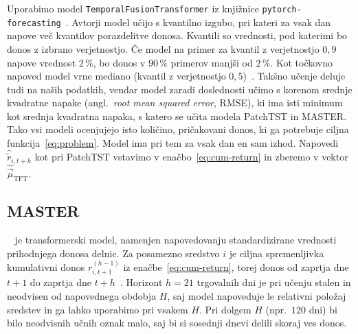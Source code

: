 \documentclass[9pt]{style/friteza}
\begin{document}
Uporabimo model \texttt{TemporalFusionTransformer} iz knjižnice \texttt{pytorch-\allowbreak forecasting}~\cite{beitner2020pytorch}. Avtorji model učijo s kvantilno izgubo, pri kateri za vsak dan napove več kvantilov porazdelitve donosa. Kvantili so vrednosti, pod katerimi bo donos z izbrano verjetnostjo. Če model na primer za kvantil z verjetnostjo $0{,}9$ napove vrednost $2\,\%$, bo donos v $90\,\%$ primerov manjši od $2\,\%$. Kot točkovno napoved model vrne mediano (kvantil z verjetnostjo $0{,}5$)~\cite{lim2021tft}. Takšno učenje deluje tudi na naših podatkih, vendar model zaradi doslednosti učimo s korenom srednje kvadratne napake (angl.\ \emph{root mean squared error}, RMSE), ki ima isti minimum kot srednja kvadratna napaka, s katero se učita modela PatchTST in MASTER. Tako vsi modeli ocenjujejo isto količino, pričakovani donos, ki ga potrebuje ciljna funkcija~\eqref{eq:problem}. Model ima pri tem za vsak dan en sam izhod. Napovedi $\hat{\tilde r}_{i,t+h}$ kot pri PatchTST vstavimo v enačbo~\eqref{eq:cum-return} in zberemo v vektor $\hat{\vec{\mu}}_{\mathrm{TFT}}$. 


\subsection{MASTER}\label{sec:master}~\cite{li2024master} je transformerski model, namenjen napovedovanju standardizirane vrednosti prihodnjega donosa delnic. Za posamezno sredstvo $i$ je ciljna spremenljivka kumulativni donos $r_{i,t+1}^{(h-1)}$ iz enačbe~\eqref{eq:cum-return}, torej donos od zaprtja dne $t+1$ do zaprtja dne $t+h$~\cite{li2024master_code}. Horizont $h=21$ trgovalnih dni je pri učenju stalen in neodvisen od napovednega obdobja $H$, saj model napoveduje le relativni položaj sredstev in ga lahko uporabimo pri vsakem $H$. Pri dolgem $H$ (npr.\ $120$ dni) bi bilo neodvisnih učnih oznak malo, saj bi si sosednji dnevi delili skoraj ves donos. 
\end{document}
